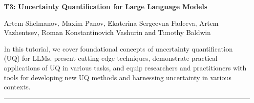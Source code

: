 \begin{center}
    \Large{\textbf{T3: Uncertainty Quantification for Large Language Models}\\}
    \par\bigskip
    \large{Artem Shelmanov, Maxim Panov, Ekaterina Sergeevna Fadeeva, Artem Vazhentsev,
Roman Konstantinovich Vashurin and Timothy Baldwin}\\
    \par\bigskip

\end{center}

In this tutorial, we cover foundational concepts of uncertainty quantification (UQ) for LLMs, present cutting-edge techniques, demonstrate practical applications of UQ in various tasks, and equip researchers and practitioners with tools for developing new UQ methods and harnessing uncertainty in various contexts.
\begin{center}
    \noindent\rule{200px}{1pt}
\end{center}
